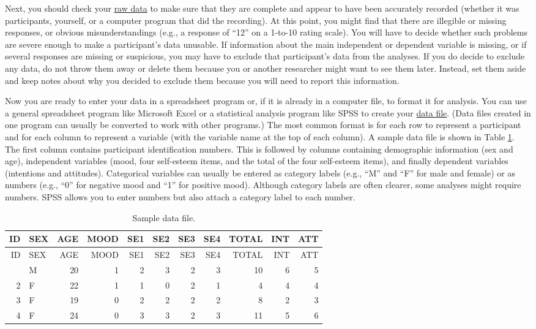 \documentclass[
]{krantz}
\begin{document}
Next, you should check your \hyperref[raw-data]{raw data} to make sure that they are complete and appear to have been accurately recorded (whether it was participants, yourself, or a computer program that did the recording). At this point, you might find that there are illegible or missing responses, or obvious misunderstandings (e.g., a response of ``12'' on a 1-to-10 rating scale). You will have to decide whether such problems are severe enough to make a participant's data unusable. If information about the main independent or dependent variable is missing, or if several responses are missing or suspicious, you may have to exclude that participant's data from the analyses. If you do decide to exclude any data, do not throw them away or delete them because you or another researcher might want to see them later. Instead, set them aside and keep notes about why you decided to exclude them because you will need to report this information.

Now you are ready to enter your data in a spreadsheet program or, if it is already in a computer file, to format it for analysis. You can use a general spreadsheet program like Microsoft Excel or a statistical analysis program like SPSS to create your \hyperref[data-file]{data file}. (Data files created in one program can usually be converted to work with other programs.) The most common format is for each row to represent a participant and for each column to represent a variable (with the variable name at the top of each column). A sample data file is shown in Table \ref{tab:sampledata}. The first column contains participant identification numbers. This is followed by columns containing demographic information (sex and age), independent variables (mood, four self-esteem items, and the total of the four self-esteem items), and finally dependent variables (intentions and attitudes). Categorical variables can usually be entered as category labels (e.g., ``M'' and ``F'' for male and female) or as numbers (e.g., ``0'' for negative mood and ``1'' for positive mood). Although category labels are often clearer, some analyses might require numbers. SPSS allows you to enter numbers but also attach a category label to each number.

\begin{longtable}[]{@{}rlrrrrrrrrr@{}}
\caption{\label{tab:sampledata} Sample data file.}\tabularnewline
\toprule\noalign{}
ID & SEX & AGE & MOOD & SE1 & SE2 & SE3 & SE4 & TOTAL & INT & ATT \\
\midrule\noalign{}
\endfirsthead
\toprule\noalign{}
ID & SEX & AGE & MOOD & SE1 & SE2 & SE3 & SE4 & TOTAL & INT & ATT \\
\midrule\noalign{}
\endhead
\bottomrule\noalign{}
\endlastfoot
1 & M & 20 & 1 & 2 & 3 & 2 & 3 & 10 & 6 & 5 \\
2 & F & 22 & 1 & 1 & 0 & 2 & 1 & 4 & 4 & 4 \\
3 & F & 19 & 0 & 2 & 2 & 2 & 2 & 8 & 2 & 3 \\
4 & F & 24 & 0 & 3 & 3 & 2 & 3 & 11 & 5 & 6 \\
\end{longtable}
\end{document}
